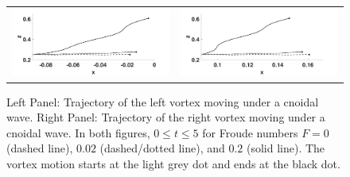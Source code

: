 \documentclass[a4paper,11pt]{article}
\begin{document}
\begin{figure}[h]
\centering
\begin{tabular}{cc}
\includegraphics[width=.48\textwidth]{leftside_cnoid_tracks} & 
\includegraphics[width=.48\textwidth]{rightside_cnoid_tracks}
\end{tabular}
\caption{\small Left Panel: Trajectory of the left vortex moving under a cnoidal wave.  Right Panel: Trajectory of the right vortex moving under a cnoidal wave.  In both figures, $0\leq t \leq 5$ for Froude numbers $F=0$ (dashed line), $0.02$ (dashed/dotted line), and $0.2$ (solid line).  The vortex motion starts at the light grey dot and ends at the black dot.}
\label{fig:cntrack}
\end{figure}


\end{document}
